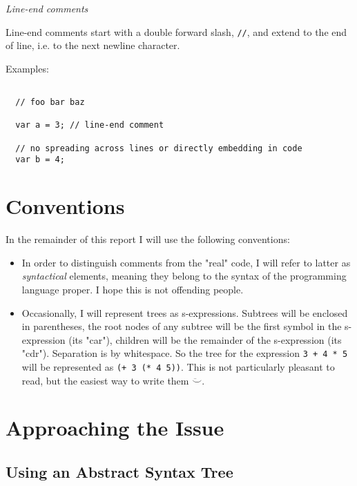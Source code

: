 \documentclass[11pt,a4paper]{article}
\begin{document}
\textit{Line-end comments}

Line-end comments start with a double forward slash, \texttt{//}, and extend to
the end of line, i.e. to the next newline character.

Examples:

\begin{verbatim}

  // foo bar baz
  
  var a = 3; // line-end comment

  // no spreading across lines or directly embedding in code
  var b = 4;

\end{verbatim}

\section{Conventions}

In the remainder of this report I will use the following conventions:

\begin{itemize}
\item In order to distinguish comments from the "real" code, I
will refer to latter as \emph{syntactical} elements, meaning they belong to the
syntax of the programming language proper. I hope this is not offending people.

\item Occasionally, I will represent trees as s-expressions. Subtrees will be
enclosed in parentheses, the root nodes of any subtree will be the first symbol
in the s-expression (its "car"), children will be the remainder of the
s-expression (its "cdr"). Separation is by whitespace. So the tree for the
expression \texttt{3 + 4 * 5} will be represented as \texttt{(+ 3 (* 4 5))}.
This is not particularly pleasant to read, but the easiest way to write them
$\ddot\smile$.
\end{itemize}




\section{Approaching the Issue}

\subsection{Using an Abstract Syntax Tree}
\end{document}
